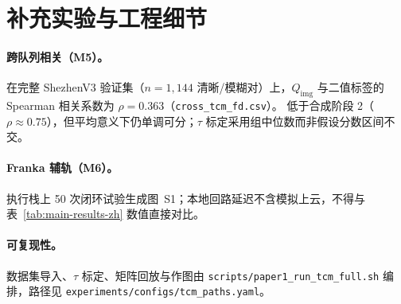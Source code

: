 \section{补充实验与工程细节}
\label{sec:app-experiments-zh}

\paragraph{跨队列相关（M5）。}
在完整 ShezhenV3 验证集（$n{=}1{,}144$ 清晰/模糊对）上，$Q_{\mathrm{img}}$ 与二值标签的 Spearman 相关系数为 $\rho{=}0.363$（\texttt{cross\_tcm\_fd.csv}）。
低于合成阶段 2（$\rho{\approx}0.75$），但平均意义下仍单调可分；$\tau$ 标定采用组中位数而非假设分数区间不交。

\paragraph{Franka 辅轨（M6）。}
执行栈上 50 次闭环试验生成图~S1；本地回路延迟不含模拟上云，不得与表~\ref{tab:main-results-zh} 数值直接对比。

\paragraph{可复现性。}
数据集导入、$\tau$ 标定、矩阵回放与作图由 \texttt{scripts/paper1\_run\_tcm\_full.sh} 编排，路径见 \texttt{experiments/configs/tcm\_paths.yaml}。









